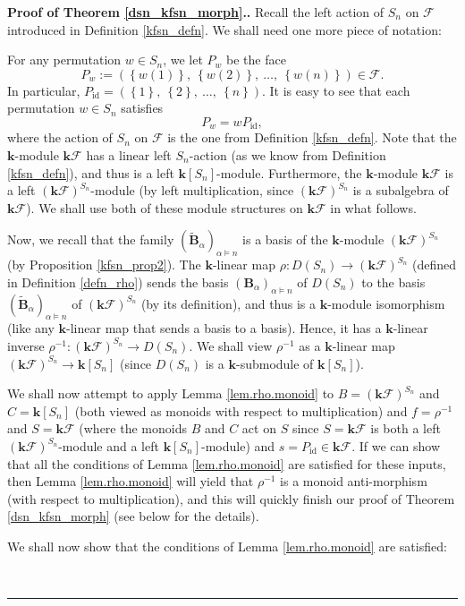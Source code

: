 \documentclass[12pt]{article}
\theoremstyle{definition}%
\theoremstyle{definition}%
\theoremstyle{remark}%
\newcommand{\tup}[1]{\left( #1 \right)}
\newcommand{\set}[1]{\left\{ #1 \right\}}
\newcommand{\kk}{\mathbf{k}}
\newcommand{\ksn}{\kk\left[S_n\right]}
\newcommand{\kf}{\kk\mathcal{F}}
\newcommand{\kfsn}{\left(\kf\right)^{S_n}}
\newcommand{\dsn}{D\left(S_n\right)}
\newcommand{\BBa}{\mathbf{B}_{\alpha}}
\newcommand{\BBta}{\widetilde{\mathbf{B}}_{\alpha}}
\newcommand{\CF}{\mathcal{F}}
\newcommand{\id}{\operatorname{id}}
\newenvironment{proof}[1][Proof]{\noindent\textbf{#1.} }{\ \rule{0.5em}{0.5em}}
\begin{document}
\begin{proof}[Proof of Theorem \ref{dsn_kfsn_morph}.]
Recall the left action of
$S_n$ on $\CF$ introduced in Definition \ref{kfsn_defn}. We shall
need one more piece of notation:

For any permutation $w\in S_n$, we let $P_{w}$ be the face
\[
P_{w}
:= \left(  \set{w\tup{1}} ,\ \set{w\tup{2}}  ,
\ \ldots,\ \set{w\tup{n}}  \right)
\in\CF.
\]
In particular, $P_{\id} = \left(  \set{1},\ \set{2},
\ \ldots,\ \set{n}  \right)$. It is easy to see that
each permutation $w\in S_n$ satisfies
\begin{equation}
P_{w}=wP_{\id},
\label{eq.Fw.=wFid}
\end{equation}
where the action of $S_n$ on $\CF$ is the one from Definition
\ref{kfsn_defn}. Note that the $\kk$-module $\kf$ has
a linear left $S_n$-action (as we know from Definition \ref{kfsn_defn}), and
thus is a left $\ksn$-module. Furthermore, the
$\kk$-module $\kf$ is a left $\kfsn$-module
(by left multiplication, since $\kfsn$ is a subalgebra of $\kf$).
We shall use both of these module structures on $\kf$ in what follows.

Now, we recall that the family $\left(  \BBta\right)  _{\alpha\models n}$
is a basis of the $\kk$-module $\kfsn$ (by Proposition \ref{kfsn_prop2}). The
$\kk$-linear map $\rho:\dsn\to\kfsn$ (defined in Definition \ref{defn_rho})
sends the basis $\left(   \BBa \right)  _{\alpha\models n}$ of
$\dsn$ to the basis
$\left(  \BBta\right)  _{\alpha\models n}$ of $\kfsn$
(by its definition), and thus is a $\kk$-module
isomorphism (like any $\kk$-linear map that sends a basis to a basis).
Hence, it has a $\kk$-linear inverse $\rho^{-1} : \kfsn
\to \dsn$. We shall
view $\rho^{-1}$ as a $\kk$-linear map $\kfsn \to \ksn$
(since $\dsn$ is a $\kk$-submodule of $\ksn$).

We shall now attempt to apply Lemma \ref{lem.rho.monoid} to $B=\kfsn$ and $C=\ksn
$ (both viewed as monoids with respect to multiplication) and $f=\rho^{-1}$
and $S=\kf$ (where the monoids $B$ and $C$ act on $S$ since
$S=\kf$ is both a left $\kfsn$-module and a left $\ksn
$-module) and $s=P_{\id}\in\kf$. If we can
show that all the conditions of Lemma \ref{lem.rho.monoid} are satisfied for
these inputs, then Lemma \ref{lem.rho.monoid} will yield that $\rho^{-1}$ is a
monoid anti-morphism (with respect to multiplication), and this will quickly
finish our proof of Theorem \ref{dsn_kfsn_morph} (see below for the details).

We shall now show that the conditions of Lemma \ref{lem.rho.monoid} are
satisfied:


\end{proof}
\end{document}

